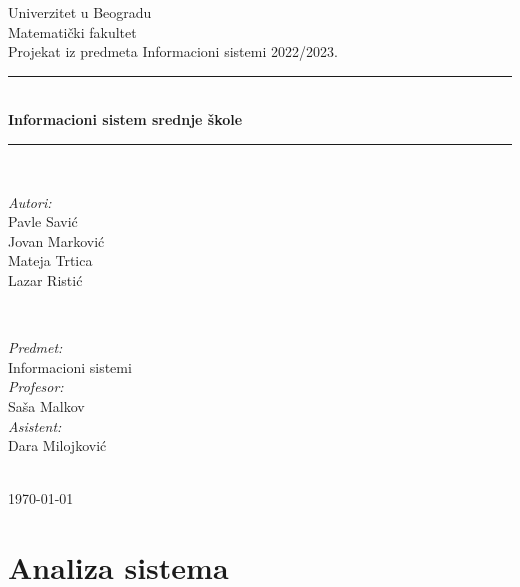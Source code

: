 \documentclass{article}
\begin{document}
\begin{titlepage}
    \centering

    \newcommand{\HRule}{\rule{\linewidth}{0.5mm}}
    \center
    \textup{\Large Univerzitet u Beogradu\\Matematički fakultet}\\[1.5cm]
    \textup{\Large Projekat iz predmeta Informacioni sistemi 2022/2023.}\\[0.4cm]

    \HRule \\[0.4cm]
    { \huge \bfseries Informacioni sistem srednje škole}\\[0.4cm]
    \HRule \\[1.1cm]
    
    \vspace{6 cm}
	
	\begin{minipage}{0.4\textwidth}
		\begin{flushleft} \large
			\emph{Autori:}\\
			Pavle Savić\\
			Jovan Marković\\
			Mateja Trtica\\
			Lazar Ristić\\		
		\end{flushleft}
	\end{minipage}
	~
	\begin{minipage}{0.5\textwidth}
		\begin{flushright} \large
			\emph{Predmet:}\\ 
			Informacioni sistemi\\
			\emph{Profesor:}\\ 
			Saša Malkov\\
			\emph{Asistent:}\\ 
			Dara Milojković
		\end{flushright}
	\end{minipage}\\[2cm]
	{\large \today}\\[2cm]
\end{titlepage}

\thispagestyle{empty}

\newpage
\renewcommand*\contentsname{Sadržaj:}
\tableofcontents


\newpage
\section{Analiza sistema}
\end{document}

